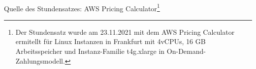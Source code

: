 \\\\
\\\\
\\\\ 
Quelle des Stundensatzes: AWS Pricing Calculator\footnote{Der Stundensatz wurde am 23.11.2021 mit dem AWS Pricing Calculator ermitellt für Linux Instanzen in Frankfurt mit 4vCPUs, 16 GB Arbeitsspeicher und Instanz-Familie t4g.xlarge in On-Demand-Zahlungsmodell\cite{AMZ17}.}
\newpage
